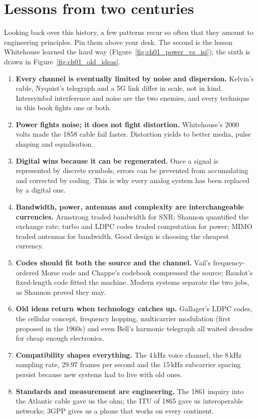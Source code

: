 \section{Lessons from two centuries}
\label{sec:ch01:lessons}

Looking back over this history, a few patterns recur so often that they amount to engineering
principles. Pin them above your desk. The second is the lesson Whitehouse learned the hard way
(Figure~\ref{fig:ch01_power_vs_isi}); the sixth is drawn in Figure~\ref{fig:ch01_old_ideas}.



\begin{enumerate}
\item \textbf{Every channel is eventually limited by noise and dispersion.} Kelvin's cable, Nyquist's
telegraph and a 5G link differ in scale, not in kind. Intersymbol interference and noise are the two
enemies, and every technique in this book fights one or both.
\item \textbf{Power fights noise; it does not fight distortion.} Whitehouse's 2000 volts made the 1858
cable fail faster. Distortion yields to better media, pulse shaping and equalisation.
\item \textbf{Digital wins because it can be regenerated.} Once a signal is represented by discrete
symbols, errors can be prevented from accumulating and corrected by coding. This is why every analog
system has been replaced by a digital one.
\item \textbf{Bandwidth, power, antennas and complexity are interchangeable currencies.} Armstrong traded
bandwidth for SNR; Shannon quantified the exchange rate; turbo and LDPC codes traded computation for
power; MIMO traded antennas for bandwidth. Good design is choosing the cheapest currency.
\item \textbf{Codes should fit both the source and the channel.} Vail's frequency-ordered Morse code
and Chappe's codebook compressed the source; Baudot's fixed-length code fitted the machine. Modern
systems separate the two jobs, as Shannon proved they may.
\item \textbf{Old ideas return when technology catches up.} Gallager's LDPC codes, the cellular concept,
frequency hopping, multicarrier modulation (first proposed in the 1960s) and even Bell's harmonic
telegraph all waited decades for cheap enough electronics.
\item \textbf{Compatibility shapes everything.} The 4\,kHz voice channel, the 8\,kHz sampling rate,
29.97 frames per second and the 15\,kHz subcarrier spacing persist because new systems had to live with
old ones.
\item \textbf{Standards and measurement are engineering.} The 1861 inquiry into the Atlantic cable gave
us the ohm; the ITU of 1865 gave us interoperable networks; 3GPP gives us a phone that works on every
continent.
\end{enumerate}

